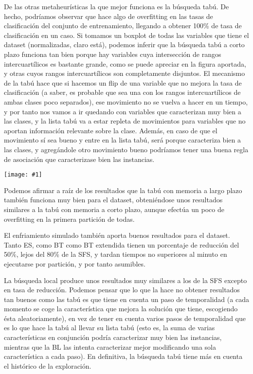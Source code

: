 \documentclass[a4paper,11pt]{article}
\newcommand{\imgn}[3]{
  \begin{minipage}{\linewidth}
    \centering
    \texttt{[image: \#1]}
    \captionof{figure}{#2}
  \end{minipage} 
}
\begin{document}
  De las otras metaheurísticas la que mejor funciona es la búsqueda tabú. De hecho, podríamos observar que hace algo de overfitting
  en las tasas de clasificación del conjunto de entrenamiento, llegando a obtener 100\% de tasa de clasificación en un caso.
  Si tomamos un boxplot de todas las variables que tiene el dataset (normalizadas, claro está), podemos inferir que la búsqueda
  tabú a corto plazo funciona tan bien porque hay variables cuya intersección de rangos intercuartílicos es bastante grande,
  como se puede apreciar en la figura aportada, y otras cuyos rangos intercuartílicos son completamente disjuntos. El mecanismo
  de la tabú hace que si hacemos un flip de una variable que no mejora la tasa de clasificación (a saber, es probable que
  sea una con los rangos intercuartílicos de ambas clases poco separados), ese movimiento no se vuelva a hacer en un tiempo,
  y por tanto nos vamos a ir quedando con variables que caracterizan muy bien a las clases, y la lista tabú va a estar repleta
  de movimientos para variables que no aportan información relevante sobre la clase. Además, en caso de que el movimiento
  sí sea bueno y entre en la lista tabú, será porque caracteriza bien a las clases, y agregándole otro movimiento bueno podríamos
  tener una buena regla de asociación que caracterizase bien las instancias.
  
  \imgn{../data/wdbctabu.png}{Boxplot de variables del wdbc}{1}
  
  Podemos afirmar a raíz de los resultados que la tabú con memoria a largo plazo también funciona muy bien para el dataset,
  obteniéndose unos resultados similares a la tabú con memoria a corto plazo, aunque efectúa un poco de overfitting en la
  primera partición de todas.
  
  El enfriamiento simulado también aporta buenos resultados para el dataset. Tanto ES, como BT como BT extendida tienen un
  porcentaje de reducción del 50\%, lejos del 80\% de la SFS, y tardan tiempos no superiores al minuto en ejecutarse por partición,
  y por tanto asumibles.
  
  La búsqueda local produce unos resultados muy similares a los de la SFS excepto en tasa de reducción. Podemos pensar que
  lo que la hace no obtener resultados tan buenos como las tabú es que tiene en cuenta un paso de temporalidad (a cada momento
  se coge la característica que mejora la solución que tiene, escogiendo ésta aleatoriamente), en vez de tener en cuenta varios
  pasos de temporalidad que es lo que hace la tabú al llevar su lista tabú (esto es, la suma de varias características en conjunción
  podría caracterizar muy bien las instancias, mientras que la BL las intenta caracterizar mejor modificando una sola característica 
  a cada paso). En definitiva, la búsqueda tabú tiene más en cuenta el histórico de la exploración.
 
\end{document}
